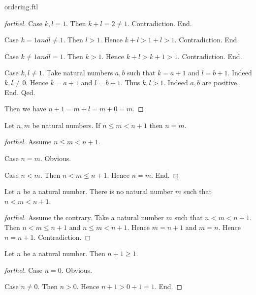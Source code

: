 \documentclass{naproche-library}
\begin{document}
\begin{smodule}{ordering.ftl}
\begin{proof}[forthel]
      Case $k,l = 1$.
        Then $k + l
          = 2
          \neq 1$.
        Contradiction.
      End.

      Case $k = 1 and l \neq 1$.
        Then $l > 1$.
        Hence $k + l
          > 1 + l
          > 1$.
        Contradiction.
      End.

      Case $k \neq 1 and l = 1$.
        Then $k > 1$.
        Hence $k + l
          > k + 1
          > 1$.
        Contradiction.
      End.

      Case $k, l \neq 1$.
        Take natural numbers $a, b$ such that $k = a + 1$ and $l = b + 1$.
        Indeed $k, l \neq 0$.
        Hence $k = a + 1$ and $l = b + 1$.
        Thus $k, l > 1$. Indeed $a, b$ are positive.
      End.
    Qed.

    Then we have $n + 1
      = m + l
      = m + 0
      = m$.
  \end{proof}

  \begin{proposition}[forthel,id=ARITHMETIC_04_8792330561650688]
    Let $n, m$ be natural numbers.
    If $n \leq m < n + 1$ then $n = m$.
  \end{proposition}
  \begin{proof}[forthel]
    Assume $n \leq m < n + 1$.

    Case $n = m$. Obvious.

    Case $n < m$.
      Then $n < m \leq n + 1$.
      Hence $n = m$.
    End.
  \end{proof}

  \begin{corollary}[forthel,id=ARITHMETIC_04_1802826644717568]
    Let $n$ be a natural number.
    There is no natural number $m$ such that $n < m < n + 1$.
  \end{corollary}
  \begin{proof}[forthel]
    Assume the contrary.
    Take a natural number $m$ such that $n < m < n + 1$.
    Then $n < m \leq n + 1$ and $n \leq m < n + 1$.
    Hence $m = n + 1$ and $m = n$.
    Hence $n = n + 1$.
    Contradiction.
  \end{proof}

  \begin{proposition}[forthel,id=ARITHMETIC_04_990407185924096]
    Let $n$ be a natural number.
    Then $n + 1 \geq 1$.
  \end{proposition}
  \begin{proof}[forthel]
    Case $n = 0$. Obvious.

    Case $n \neq 0$.
      Then $n > 0$.
      Hence $n + 1 > 0 + 1 = 1$.
    End.
  \end{proof}



\end{smodule}
\end{document}
